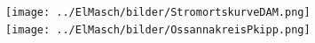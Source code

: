 	\begin{minipage}{7cm}
    	\texttt{[image: ../ElMasch/bilder/StromortskurveDAM.png]}\\
    	\texttt{[image: ../ElMasch/bilder/OssannakreisPkipp.png]}
    \end{minipage}

        
		
% 		
% 		


